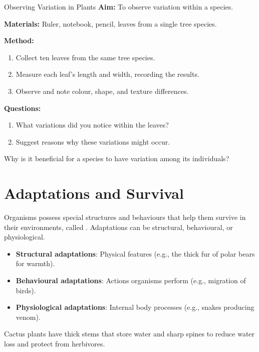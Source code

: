 \begin{investigation}{Observing Variation in Plants}
\textbf{Aim:} To observe variation within a species.

\textbf{Materials:} Ruler, notebook, pencil, leaves from a single tree species.

\textbf{Method:}
\begin{enumerate}
    \item Collect ten leaves from the same tree species.
    \item Measure each leaf’s length and width, recording the results.
    \item Observe and note colour, shape, and texture differences.
\end{enumerate}

\textbf{Questions:}
\begin{enumerate}
    \item What variations did you notice within the leaves?
    \item Suggest reasons why these variations might occur.
\end{enumerate}
\end{investigation}

\begin{stopandthink}
Why is it beneficial for a species to have variation among its individuals?
\end{stopandthink}

\section{Adaptations and Survival}

Organisms possess special structures and behaviours that help them survive in their environments, called . Adaptations can be structural, behavioural, or physiological.

\begin{itemize}
    \item \textbf{Structural adaptations}: Physical features (e.g., the thick fur of polar bears for warmth).
    \item \textbf{Behavioural adaptations}: Actions organisms perform (e.g., migration of birds).
    \item \textbf{Physiological adaptations}: Internal body processes (e.g., snakes producing venom).
\end{itemize}

\begin{example}
Cactus plants have thick stems that store water and sharp spines to reduce water loss and protect from herbivores.
\end{example}


